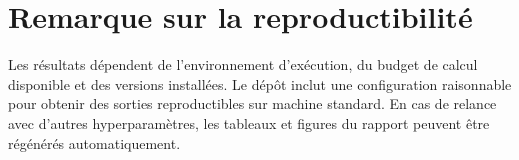 \section{Remarque sur la reproductibilité}
Les résultats dépendent de l’environnement d’exécution, du budget de calcul disponible et des versions installées. Le dépôt inclut une configuration raisonnable pour obtenir des sorties reproductibles sur machine standard. En cas de relance avec d’autres hyperparamètres, les tableaux et figures du rapport peuvent être régénérés automatiquement.


